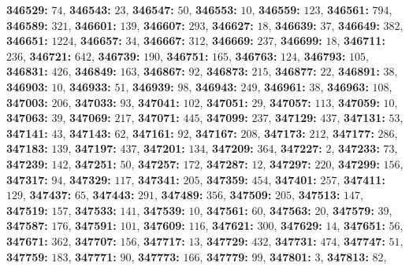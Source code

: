 \textsf{\bfseries 346529:} $74$, \textsf{\bfseries 346543:} $23$, \textsf{\bfseries 346547:} $50$, \textsf{\bfseries 346553:} $10$, \textsf{\bfseries 346559:} $123$, \textsf{\bfseries 346561:} $794$, \textsf{\bfseries 346589:} $321$, \textsf{\bfseries 346601:} $139$, \textsf{\bfseries 346607:} $293$, \textsf{\bfseries 346627:} $18$, \textsf{\bfseries 346639:} $37$, \textsf{\bfseries 346649:} $382$, \textsf{\bfseries 346651:} $1224$, \textsf{\bfseries 346657:} $34$, \textsf{\bfseries 346667:} $312$, \textsf{\bfseries 346669:} $237$, \textsf{\bfseries 346699:} $18$, \textsf{\bfseries 346711:} $236$, \textsf{\bfseries 346721:} $642$, \textsf{\bfseries 346739:} $190$, \textsf{\bfseries 346751:} $165$, \textsf{\bfseries 346763:} $124$, \textsf{\bfseries 346793:} $105$, \textsf{\bfseries 346831:} $426$, \textsf{\bfseries 346849:} $163$, \textsf{\bfseries 346867:} $92$, \textsf{\bfseries 346873:} $215$, \textsf{\bfseries 346877:} $22$, \textsf{\bfseries 346891:} $38$, \textsf{\bfseries 346903:} $10$, \textsf{\bfseries 346933:} $51$, \textsf{\bfseries 346939:} $98$, \textsf{\bfseries 346943:} $249$, \textsf{\bfseries 346961:} $38$, \textsf{\bfseries 346963:} $108$, \textsf{\bfseries 347003:} $206$, \textsf{\bfseries 347033:} $93$, \textsf{\bfseries 347041:} $102$, \textsf{\bfseries 347051:} $29$, \textsf{\bfseries 347057:} $113$, \textsf{\bfseries 347059:} $10$, \textsf{\bfseries 347063:} $39$, \textsf{\bfseries 347069:} $217$, \textsf{\bfseries 347071:} $445$, \textsf{\bfseries 347099:} $237$, \textsf{\bfseries 347129:} $437$, \textsf{\bfseries 347131:} $53$, \textsf{\bfseries 347141:} $43$, \textsf{\bfseries 347143:} $62$, \textsf{\bfseries 347161:} $92$, \textsf{\bfseries 347167:} $208$, \textsf{\bfseries 347173:} $212$, \textsf{\bfseries 347177:} $286$, \textsf{\bfseries 347183:} $139$, \textsf{\bfseries 347197:} $437$, \textsf{\bfseries 347201:} $134$, \textsf{\bfseries 347209:} $364$, \textsf{\bfseries 347227:} $2$, \textsf{\bfseries 347233:} $73$, \textsf{\bfseries 347239:} $142$, \textsf{\bfseries 347251:} $50$, \textsf{\bfseries 347257:} $172$, \textsf{\bfseries 347287:} $12$, \textsf{\bfseries 347297:} $220$, \textsf{\bfseries 347299:} $156$, \textsf{\bfseries 347317:} $94$, \textsf{\bfseries 347329:} $117$, \textsf{\bfseries 347341:} $205$, \textsf{\bfseries 347359:} $454$, \textsf{\bfseries 347401:} $257$, \textsf{\bfseries 347411:} $129$, \textsf{\bfseries 347437:} $65$, \textsf{\bfseries 347443:} $291$, \textsf{\bfseries 347489:} $356$, \textsf{\bfseries 347509:} $205$, \textsf{\bfseries 347513:} $147$, \textsf{\bfseries 347519:} $157$, \textsf{\bfseries 347533:} $141$, \textsf{\bfseries 347539:} $10$, \textsf{\bfseries 347561:} $60$, \textsf{\bfseries 347563:} $20$, \textsf{\bfseries 347579:} $39$, \textsf{\bfseries 347587:} $176$, \textsf{\bfseries 347591:} $101$, \textsf{\bfseries 347609:} $116$, \textsf{\bfseries 347621:} $300$, \textsf{\bfseries 347629:} $14$, \textsf{\bfseries 347651:} $56$, \textsf{\bfseries 347671:} $362$, \textsf{\bfseries 347707:} $156$, \textsf{\bfseries 347717:} $13$, \textsf{\bfseries 347729:} $432$, \textsf{\bfseries 347731:} $474$, \textsf{\bfseries 347747:} $51$, \textsf{\bfseries 347759:} $183$, \textsf{\bfseries 347771:} $90$, \textsf{\bfseries 347773:} $166$, \textsf{\bfseries 347779:} $99$, \textsf{\bfseries 347801:} $3$, \textsf{\bfseries 347813:} $82$, 
